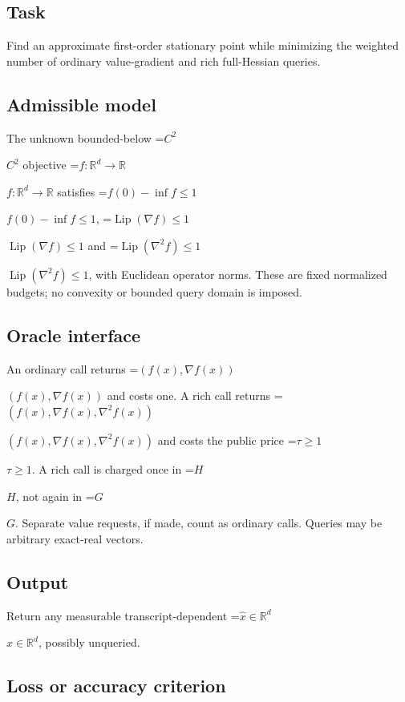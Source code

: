 \documentclass[10pt,a4paper]{article}
\newcommand{\AtlasMath}[1]{\par\begingroup\centering\setbox0=\hbox{$\displaystyle #1$}\ifdim\wd0>1.4\linewidth\typeout{ATLAS WIDE FORMULA: \the\wd0}\fi\ifdim\wd0>\linewidth\resizebox{\linewidth}{!}{\box0}\else\box0\fi\par\endgroup}
\newcommand{\AtlasInlineMath}[1]{\begingroup\setbox0=\hbox{$#1$}\ifdim\wd0>.4\linewidth\endgroup\AtlasMath{#1}\else\endgroup$#1$\fi}
\begin{document}
\subsection{Task}


Find an approximate first-order stationary point while minimizing the weighted number of ordinary value-gradient and rich full-Hessian queries.



\subsection{Admissible model}


The unknown bounded-below \AtlasInlineMath{C^2} objective \AtlasInlineMath{f:\mathbb R^d\to\mathbb R} satisfies \AtlasInlineMath{f(0)-\inf f\le1}, \AtlasInlineMath{\operatorname{Lip}(\nabla f)\le1} and \AtlasInlineMath{\operatorname{Lip}(\nabla^2f)\le1}, with Euclidean operator norms. These are fixed normalized budgets; no convexity or bounded query domain is imposed.



\subsection{Oracle interface}


An ordinary call returns \AtlasInlineMath{(f(x),\nabla f(x))} and costs one. A rich call returns \AtlasInlineMath{(f(x),\nabla f(x),\nabla^2f(x))} and costs the public price \AtlasInlineMath{\tau\ge1}. A rich call is charged once in \AtlasInlineMath{H}, not again in \AtlasInlineMath{G}. Separate value requests, if made, count as ordinary calls. Queries may be arbitrary exact-real vectors.



\subsection{Output}


Return any measurable transcript-dependent \AtlasInlineMath{\widehat x\in\mathbb R^d}, possibly unqueried.



\subsection{Loss or accuracy criterion}
\end{document}
